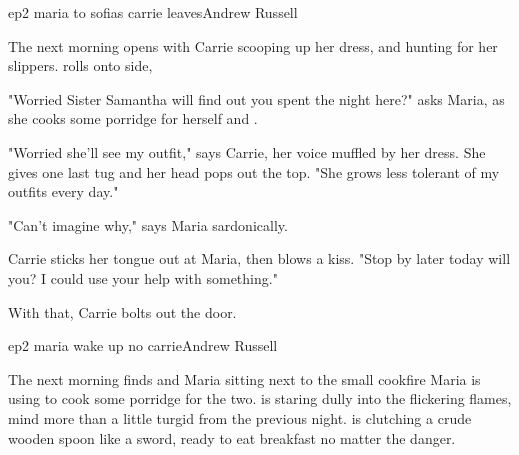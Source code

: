 \documentclass{book}
\begin{document}
\begin{childnode}{ep2 maria to sofias carrie leaves}{Andrew Russell}

    The next morning opens with Carrie scooping up her dress, and hunting for her slippers. \name{} rolls onto \hisher{} side, 

    "Worried Sister Samantha will find out you spent the night here?" asks Maria, as she cooks some porridge for herself and \name{}.

    "Worried she'll see my outfit," says Carrie, her voice muffled by her dress. She gives one last tug and her head pops out the top. "She grows less tolerant of my outfits every day."

    "Can't imagine why," says Maria sardonically. 

    Carrie sticks her tongue out at Maria, then blows \name{} a kiss. "Stop by later today will you? I could use your help with something."

    With that, Carrie bolts out the door.


\end{childnode}


\begin{childnode}{ep2 maria wake up no carrie}{Andrew Russell}

    The next morning finds \name{} and Maria sitting next to the small cookfire Maria is using to cook some porridge for the two. \name{} is staring dully into the flickering flames, \hisher{} mind more than a little turgid from the previous night. \HeShe{}
    is clutching a crude wooden spoon like a sword, ready to eat \hisher{} breakfast no matter the danger.


\end{childnode}
\end{document}
